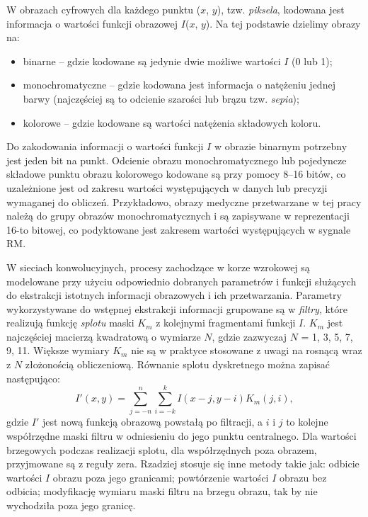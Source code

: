 W obrazach cyfrowych dla każdego punktu ($x$, $y$), tzw. \textit{piksela}, kodowana jest informacja o wartości funkcji obrazowej $I$($x$, $y$). Na tej podstawie dzielimy obrazy na:
\begin{itemize}[noitemsep,nolistsep]
	\item binarne – gdzie kodowane są jedynie dwie możliwe wartości $I$ (0 lub 1);
	\item monochromatyczne – gdzie kodowana jest informacja o natężeniu jednej barwy (najczęściej są to odcienie szarości lub brązu tzw. \textit{sepia});
	\item kolorowe – gdzie kodowane są wartości natężenia składowych koloru.
\end{itemize}
Do zakodowania informacji o wartości funkcji $I$ w obrazie binarnym potrzebny jest jeden bit na punkt. Odcienie obrazu monochromatycznego lub pojedyncze składowe punktu obrazu kolorowego kodowane są przy pomocy 8--16 bitów, co uzależnione jest od zakresu wartości występujących w danych lub precyzji wymaganej do obliczeń. Przykładowo, obrazy medyczne przetwarzane w tej pracy należą do grupy obrazów monochromatycznych i są zapisywane w reprezentacji 16-to bitowej, co podyktowane jest zakresem wartości występujących w sygnale RM.

W sieciach konwolucyjnych, procesy zachodzące w korze wzrokowej są modelowane przy użyciu odpowiednio dobranych parametrów i funkcji służących do ekstrakcji istotnych informacji obrazowych i ich przetwarzania. Parametry wykorzystywane \linebreak do wstępnej ekstrakcji informacji grupowane są w \textit{filtry}, które realizują funkcję \textit{splotu} maski $K_m$ z kolejnymi fragmentami funkcji $I$. $K_m$ jest najczęściej macierzą kwadratową o wymiarze $N$, gdzie zazwyczaj $N$ = {1, 3, 5, 7, 9, 11}. Większe wymiary $K_m$ nie \linebreak są w praktyce stosowane z uwagi na rosnącą wraz z $N$ złożonością obliczeniową. Równanie splotu dyskretnego można zapisać następująco:
\begin{equation}
	I'\left(x, y\right) = \sum_{j=-n}^{n} \sum_{i=-k}^{k} I\left(x - j, y - i \right)K_m\left(j, i\right),
\end{equation}
gdzie $I'$ jest nową funkcją obrazową powstałą po filtracji, a $i$ i $j$ to kolejne współrzędne maski filtru w odniesieniu do jego punktu centralnego. Dla wartości brzegowych podczas realizacji splotu, dla współrzędnych poza obrazem, przyjmowane są z reguły zera. Rzadziej stosuje się inne metody takie jak: odbicie wartości $I$ obrazu poza jego granicami; powtórzenie wartości $I$ obrazu bez odbicia; modyfikację wymiaru maski filtru na brzegu obrazu, tak by nie wychodziła poza jego granicę.

